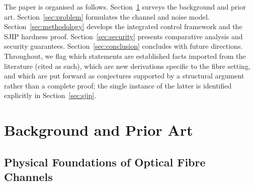 \documentclass[journal,twocolumn]{IEEEtran}
\theoremstyle{definition}
\theoremstyle{plain}
\begin{document}
The paper is organised as follows.  Section~\ref{sec:background}
surveys the background and prior art.  Section~\ref{sec:problem}
formulates the channel and noise model.
Section~\ref{sec:methodology} develops the integrated control
framework and the SJIP hardness proof.
Section~\ref{sec:security} presents comparative analysis and
security guarantees.  Section~\ref{sec:conclusion} concludes with
future directions. Throughout, we flag which statements are
established facts imported from the literature (cited as such),
which are new derivations specific to the fibre setting, and which
are put forward as conjectures supported by a structural argument
rather than a complete proof; the single instance of the latter is
identified explicitly in Section~\ref{sec:sjip}.

\section{Background and Prior Art}
\label{sec:background}

\subsection{Physical Foundations of Optical Fibre Channels}
\label{subsec:physical_foundations}
\end{document}
